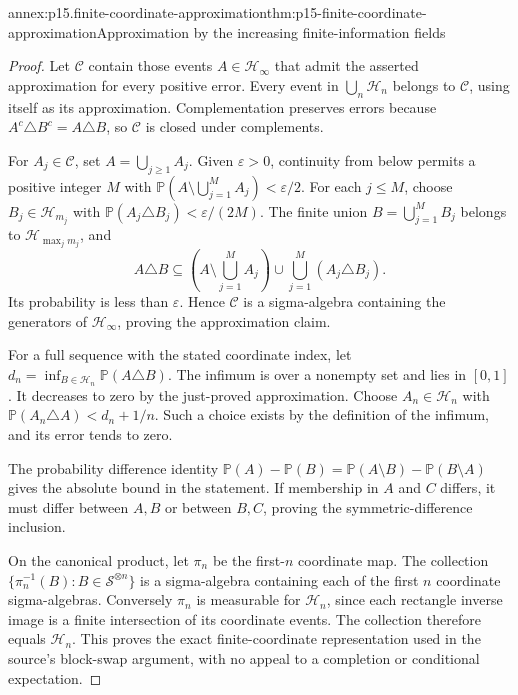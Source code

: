 \begin{annexitem}{annex:p15.finite-coordinate-approximation}{thm:p15-finite-coordinate-approximation}{Approximation by the increasing finite-information fields}
\begin{proof}
Let \(\mathcal C\) contain those events \(A\in\mathcal H_\infty\)
that admit the asserted approximation for every positive error.
Every event in \(\bigcup_n\mathcal H_n\) belongs to
\(\mathcal C\), using itself as its approximation.
Complementation preserves errors because
\(A^c\triangle B^c=A\triangle B\), so \(\mathcal C\)
is closed under complements.

For \(A_j\in\mathcal C\), set \(A=\bigcup_{j\geq1}A_j\).
Given \(\varepsilon>0\), continuity from below permits a
positive integer \(M\) with
\(\mathbb P(A\setminus\bigcup_{j=1}^M A_j)<\varepsilon/2\).
For each \(j\leq M\), choose \(B_j\in\mathcal H_{m_j}\)
with \(\mathbb P(A_j\triangle B_j)<\varepsilon/(2M)\).
The finite union \(B=\bigcup_{j=1}^M B_j\) belongs to
\(\mathcal H_{\max_jm_j}\), and
\[
 A\triangle B\subseteq
    \left(A\setminus\bigcup_{j=1}^M A_j\right)
       \cup\bigcup_{j=1}^M(A_j\triangle B_j).
\]
Its probability is less than \(\varepsilon\). Hence
\(\mathcal C\) is a sigma-algebra containing the generators
of \(\mathcal H_\infty\), proving the approximation claim.

For a full sequence with the stated coordinate index, let
\(d_n=\inf_{B\in\mathcal H_n}\mathbb P(A\triangle B)\).
The infimum is over a nonempty set and lies in \([0,1]\).
It decreases to zero by the just-proved approximation. Choose
\(A_n\in\mathcal H_n\) with
\(\mathbb P(A_n\triangle A)<d_n+1/n\). Such a choice exists
by the definition of the infimum, and its error tends to zero.

The probability difference identity
\(\mathbb P(A)-\mathbb P(B)=\mathbb P(A\setminus B)
-\mathbb P(B\setminus A)\) gives the absolute bound in
the statement. If membership in \(A\) and \(C\) differs,
it must differ between \(A,B\) or between \(B,C\), proving
the symmetric-difference inclusion.

On the canonical product, let \(\pi_n\) be the first-\(n\)
coordinate map. The collection
\(\{\pi_n^{-1}(B):B\in\mathcal S^{\otimes n}\}\) is a
sigma-algebra containing each of the first \(n\) coordinate
sigma-algebras. Conversely \(\pi_n\) is measurable for
\(\mathcal H_n\), since each rectangle inverse image is
a finite intersection of its coordinate events. The collection
therefore equals \(\mathcal H_n\). This proves the exact
finite-coordinate representation used in the source's block-swap
argument, with no appeal to a completion or conditional expectation.
\end{proof}
\end{annexitem}

